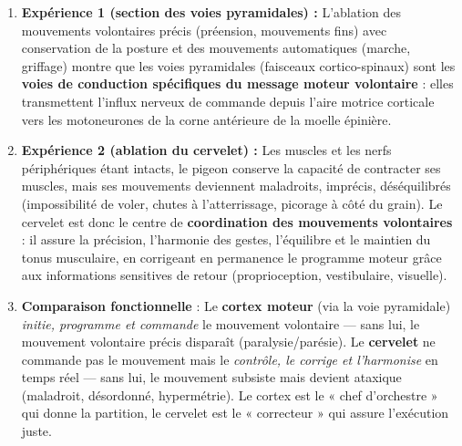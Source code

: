 \documentclass[11pt]{article}
\begin{document}
\begin{corrige}
\begin{enumerate}
\item \textbf{Expérience 1 (section des voies pyramidales) :} L'ablation des mouvements volontaires précis (préension, mouvements fins) avec conservation de la posture et des mouvements automatiques (marche, griffage) montre que les voies pyramidales (faisceaux cortico-spinaux) sont les \textbf{voies de conduction spécifiques du message moteur volontaire} : elles transmettent l'influx nerveux de commande depuis l'aire motrice corticale vers les motoneurones de la corne antérieure de la moelle épinière.
\item \textbf{Expérience 2 (ablation du cervelet) :} Les muscles et les nerfs périphériques étant intacts, le pigeon conserve la capacité de contracter ses muscles, mais ses mouvements deviennent maladroits, imprécis, déséquilibrés (impossibilité de voler, chutes à l'atterrissage, picorage à côté du grain). Le cervelet est donc le centre de \textbf{coordination des mouvements volontaires} : il assure la précision, l'harmonie des gestes, l'équilibre et le maintien du tonus musculaire, en corrigeant en permanence le programme moteur grâce aux informations sensitives de retour (proprioception, vestibulaire, visuelle).
\item \textbf{Comparaison fonctionnelle} : Le \textbf{cortex moteur} (via la voie pyramidale) \emph{initie, programme et commande} le mouvement volontaire — sans lui, le mouvement volontaire précis disparaît (paralysie/parésie). Le \textbf{cervelet} ne commande pas le mouvement mais le \emph{contrôle, le corrige et l'harmonise} en temps réel — sans lui, le mouvement subsiste mais devient ataxique (maladroit, désordonné, hypermétrie). Le cortex est le « chef d'orchestre » qui donne la partition, le cervelet est le « correcteur » qui assure l'exécution juste.
\end{enumerate}
\end{corrige}
\end{document}
